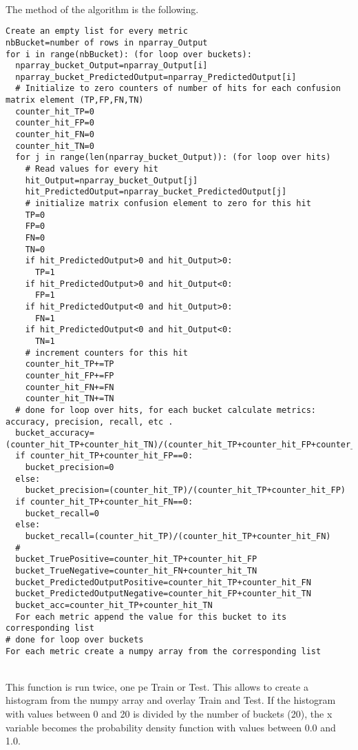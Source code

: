 \ \\The method of the algorithm is the following.
\begin{verbatim}
Create an empty list for every metric
nbBucket=number of rows in nparray_Output
for i in range(nbBucket): (for loop over buckets): 
  nparray_bucket_Output=nparray_Output[i]
  nparray_bucket_PredictedOutput=nparray_PredictedOutput[i]
  # Initialize to zero counters of number of hits for each confusion matrix element (TP,FP,FN,TN)
  counter_hit_TP=0
  counter_hit_FP=0
  counter_hit_FN=0
  counter_hit_TN=0
  for j in range(len(nparray_bucket_Output)): (for loop over hits)
    # Read values for every hit
    hit_Output=nparray_bucket_Output[j]
    hit_PredictedOutput=nparray_bucket_PredictedOutput[j] 
    # initialize matrix confusion element to zero for this hit
    TP=0
    FP=0
    FN=0
    TN=0
    if hit_PredictedOutput>0 and hit_Output>0:
      TP=1 
    if hit_PredictedOutput>0 and hit_Output<0:
      FP=1
    if hit_PredictedOutput<0 and hit_Output>0:
      FN=1 
    if hit_PredictedOutput<0 and hit_Output<0:
      TN=1 
    # increment counters for this hit
    counter_hit_TP+=TP
    counter_hit_FP+=FP
    counter_hit_FN+=FN
    counter_hit_TN+=TN
  # done for loop over hits, for each bucket calculate metrics: accuracy, precision, recall, etc . 
  bucket_accuracy=(counter_hit_TP+counter_hit_TN)/(counter_hit_TP+counter_hit_FP+counter_hit_FN+counter_hit_TN)
  if counter_hit_TP+counter_hit_FP==0:
    bucket_precision=0
  else:
    bucket_precision=(counter_hit_TP)/(counter_hit_TP+counter_hit_FP)
  if counter_hit_TP+counter_hit_FN==0:
    bucket_recall=0
  else:
    bucket_recall=(counter_hit_TP)/(counter_hit_TP+counter_hit_FN)
  #
  bucket_TruePositive=counter_hit_TP+counter_hit_FP
  bucket_TrueNegative=counter_hit_FN+counter_hit_TN
  bucket_PredictedOutputPositive=counter_hit_TP+counter_hit_FN
  bucket_PredictedOutputNegative=counter_hit_FP+counter_hit_TN
  bucket_acc=counter_hit_TP+counter_hit_TN
  For each metric append the value for this bucket to its corresponding list
# done for loop over buckets 
For each metric create a numpy array from the corresponding list
\end{verbatim}

\ \\This function is run twice, one pe Train or Test. This allows to create a histogram from the numpy array and overlay Train and Test. If the histogram with values between 0 and 20 is divided by the number of buckets (20), the x variable becomes the probability density function with values between 0.0 and 1.0. 
